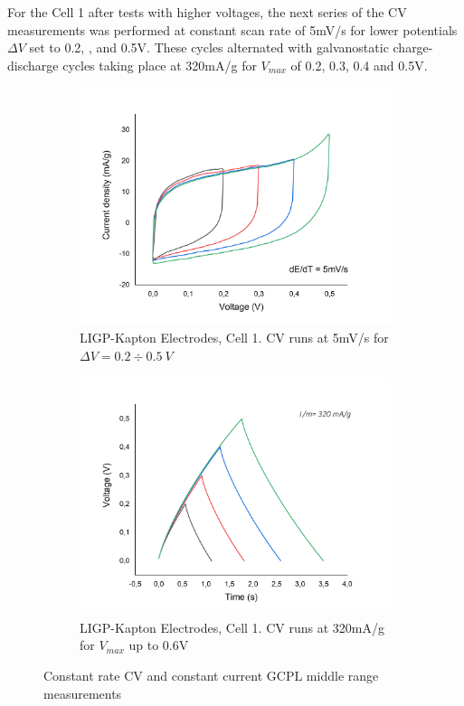 For the Cell 1 after tests with higher voltages, the next series of the CV measurements was performed at constant scan rate of 5\:mV/s for lower potentials  $\Delta V$ set to 0.2, ,\: and 0.5\:V. These cycles alternated with galvanostatic charge-discharge cycles taking place at 320\:mA/g for $V_{max}$ of 0.2, 0.3, 0.4 and 0.5\:V.

\begin{figure}[H]
\begin{subfigure}{0.49\textwidth}
\includegraphics[width=1\textwidth]{Figures/Results/Electrochemistry/LIGP-PI-NaNO3-Swagelok/Cell1/CV-Coming-back-V-06-cell1.jpg} 
\captionsetup{width=0.9\linewidth}
\caption{LIGP-Kapton Electrodes, Cell 1. CV runs at 5\:mV/s for $\Delta V= 0.2 \div 0.5\:V$}
\label{fig:LIG-PI-cell1-CV-06}
\end{subfigure}
\begin{subfigure}{0.49\textwidth}
\includegraphics[width=1\textwidth]{Figures/Results/Electrochemistry/LIGP-PI-NaNO3-Swagelok/Cell1/GCPL_Vmax06_cell1_const-current.jpg}
\captionsetup{width=0.9\linewidth}
\caption{LIGP-Kapton Electrodes, Cell 1. CV runs at  320\:mA/g for $V_{max}$ up to 0.6\:V}
\label{fig:LIG-PI-cell1-CC-06}
\end{subfigure}
\medskip
\caption{Constant rate CV and constant current GCPL middle range measurements}
\label{fig:LIG-PI-Cell1-06}
\end{figure}


